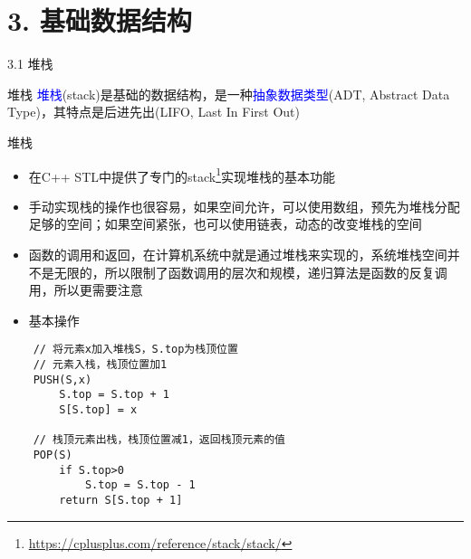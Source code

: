 


\frame{\titlepage}
\section{3. 基础数据结构}
\begin{frame}{3.1 堆栈}
    \begin{block}{堆栈}
        \textcolor{blue}{堆栈}(stack)是基础的数据结构，是一种\textcolor{blue}{抽象数据类型}(ADT, Abstract Data Type)，其特点是后进先出(LIFO, Last In First Out)
    \end{block}
    \vfill
    \begin{center}
    \end{center}

\end{frame}
\begin{frame}{堆栈}
    \begin{itemize}
        \item 在C++ STL中提供了专门的stack\footnote{\url{https://cplusplus.com/reference/stack/stack/}}实现堆栈的基本功能
        \vfill
        \item 手动实现栈的操作也很容易，如果空间允许，可以使用数组，预先为堆栈分配足够的空间；如果空间紧张，也可以使用链表，动态的改变堆栈的空间
        \vfill
        \item 函数的调用和返回，在计算机系统中就是通过堆栈来实现的，系统堆栈空间并不是无限的，所以限制了函数调用的层次和规模，递归算法是函数的反复调用，所以更需要注意
    \end{itemize}
\end{frame}
\vspace*{8ex}
\begin{itemize}
    \item[] \Large{基本操作}
\end{itemize}
\begin{lstlisting}
    // 将元素x加入堆栈S，S.top为栈顶位置
    // 元素入栈，栈顶位置加1
    PUSH(S,x) 
        S.top = S.top + 1 
        S[S.top] = x

    // 栈顶元素出栈，栈顶位置减1，返回栈顶元素的值
    POP(S) 
        if S.top>0
            S.top = S.top - 1
        return S[S.top + 1]
\end{lstlisting}
